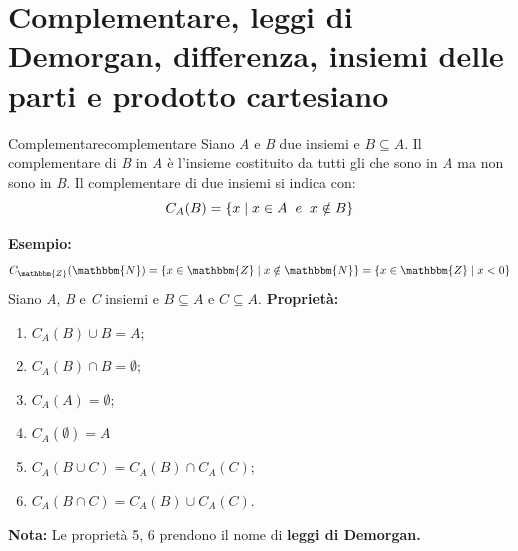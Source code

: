 \documentclass[12pt, letterpaper]{report}
\newcounter{definition}
\newcommand{\nmu}{}
\begin{document}
	\section{Complementare, leggi di Demorgan, differenza, insiemi delle parti e prodotto cartesiano}
	\begin{definition}{\nmu Complementare}{complementare}
		Siano \textit{A} e \textit{B} due insiemi e $B \subseteq A$. Il complementare di \textit{B} in \textit{A} è l'insieme costituito da tutti gli che sono in \textit{A} ma non sono in \textit{B}.
		Il complementare di due insiemi si indica con:
		\[
		C_{A}(B) = \{x \mid x \in A \hspace{0.2cm} e \hspace{0.2cm} x \notin B\}
		\]
	\end{definition}
	\textbf{Esempio: }
	\[
	C_{\mathbbm{Z}}(\mathbbm{N}) = \{x \in \mathbbm{Z} \mid x \notin \mathbbm{N}\} = \{x \in \mathbbm{Z} \mid x < 0\}
	\]
	Siano \textit{A}, \textit{B} e \textit{C} insiemi e $B \subseteq A$ e $C \subseteq A$. \textbf{Proprietà: }
	\begin{enumerate}
		\item $C_{A}(B) \cup B = A$;
		\item $C_{A}(B) \cap B = \emptyset$;
		\item $C_{A}(A) = \emptyset$;
		\item $C_{A}(\emptyset) = A$
		\item $C_{A}(B \cup C) = C_{A}(B) \cap C_{A}(C)$;
		\item $C_{A}(B \cap C) = C_{A}(B) \cup C_{A}(C)$.
	\end{enumerate}
	\textbf{Nota: } Le proprietà 5, 6 prendono il nome di \textbf{leggi di Demorgan.}
\end{document}
